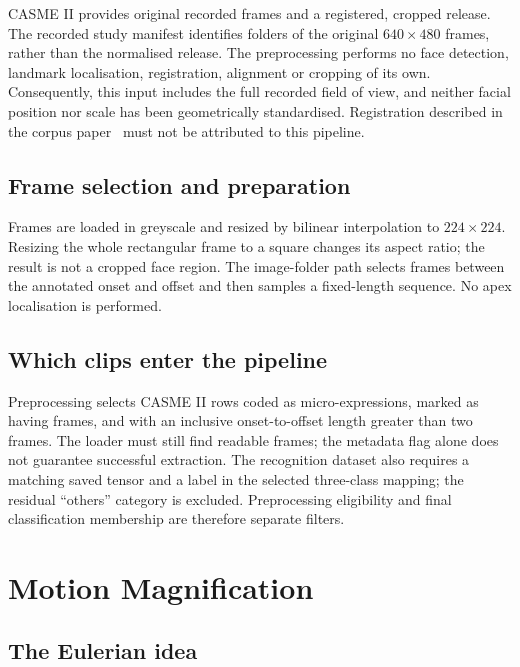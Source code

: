 CASME II provides original recorded frames and a registered, cropped release. The recorded study manifest identifies folders of the original $640\times480$ frames, rather than the normalised release. The preprocessing performs no face detection, landmark localisation, registration, alignment or cropping of its own. Consequently, this input includes the full recorded field of view, and neither facial position nor scale has been geometrically standardised. Registration described in the corpus paper~\cite{yan2014} must not be attributed to this pipeline.

\subsection{Frame selection and preparation}
\label{sec:frame-preparation}

Frames are loaded in greyscale and resized by bilinear interpolation to $224\times224$. Resizing the whole rectangular frame to a square changes its aspect ratio; the result is not a cropped face region. The image-folder path selects frames between the annotated onset and offset and then samples a fixed-length sequence. No apex localisation is performed.

\subsection{Which clips enter the pipeline}
\label{sec:clip-selection}

Preprocessing selects CASME II rows coded as micro-expressions, marked as having frames, and with an inclusive onset-to-offset length greater than two frames. The loader must still find readable frames; the metadata flag alone does not guarantee successful extraction. The recognition dataset also requires a matching saved tensor and a label in the selected three-class mapping; the residual ``others'' category is excluded. Preprocessing eligibility and final classification membership are therefore separate filters.

\section{Motion Magnification}
\label{sec:motion-magnification}

\subsection{The Eulerian idea}
\label{sec:eulerian-idea}

